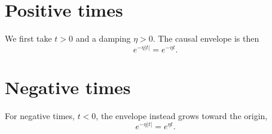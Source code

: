 \documentclass{article}
\begin{document}
\section{Positive times}
We first take $t>0$ and a damping $\eta>0$. The causal envelope is then
\begin{equation}
e^{-\eta|t|} = e^{-\eta t} .
\label{eq:pos}
\end{equation}
\section{Negative times}
For negative times, $t<0$, the envelope instead grows toward the origin,
\begin{equation}
e^{-\eta|t|} = e^{\eta t} .
\label{eq:neg}
\end{equation}
\end{document}
